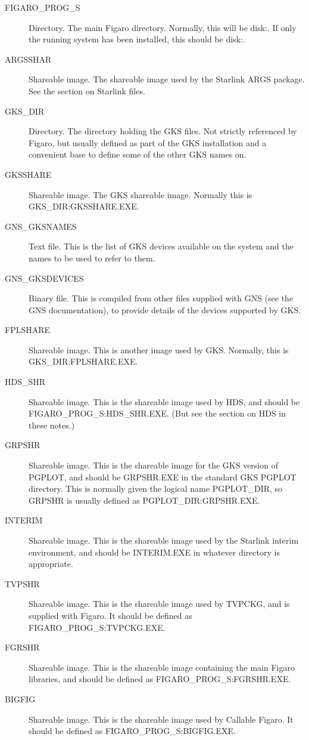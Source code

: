 \begin{description}

\item [FIGARO\_PROG\_S] Directory. The main Figaro directory. Normally, this
will be disk:. If only the running system has been
installed, this should be disk:.

\item [ARGSSHAR] Shareable image. The shareable image used by the Starlink
ARGS package. See the section on Starlink files.

\item [GKS\_DIR] Directory. The directory holding the GKS files. Not
strictly referenced by Figaro, but usually defined as part of the GKS
installation and a convenient base to define some of the other GKS names
on.

\item [GKSSHARE] Shareable image. The GKS shareable image. Normally this is
GKS\_\-DIR:\-GKS\-SHARE.EXE.

\item [GNS\_GKSNAMES] Text file. This is the list of GKS devices
available on the system and the names to be used to refer to them.

\item [GNS\_GKSDEVICES] Binary file. This is compiled from other files
supplied with GNS (see the GNS documentation), to provide details of
the devices supported by GKS.

\item [FPLSHARE] Shareable image. This is another image used by
GKS. Normally, this is GKS\_\-DIR:\-FPLSHARE.EXE.

\item [HDS\_SHR] Shareable image. This is the shareable image used
by HDS, and should be FIG\-ARO\_\-PROG\_S:HDS\_SHR.EXE. (But see the
section on HDS in these notes.)

\item [GRPSHR] Shareable image. This is the shareable image for the GKS
version of PGPLOT, and should be GRPSHR.EXE in the standard GKS PGPLOT
directory. This is normally given the logical name PGPLOT\_DIR, so GRPSHR
is usually defined as PGPLOT\_DIR:\-GRPSHR.EXE.

\item [INTERIM] Shareable image. This is the shareable image used by the
Starlink interim environment, and should be INTERIM.EXE in whatever
directory is appropriate.

\item [TVPSHR] Shareable image. This is the shareable image used by TVPCKG, and
is supplied with Figaro. It should be defined as FIGARO\_PROG\_S:TVPCKG.EXE.

\item [FGRSHR] Shareable image. This is the shareable image containing the main
Figaro libraries, and should be defined as FIGARO\_PROG\_S:FGRSHR.EXE.

\item [BIGFIG] Shareable image. This is the shareable image used by Callable
Figaro. It should be defined as FIGARO\_PROG\_S:BIGFIG.EXE.

\end{description}

